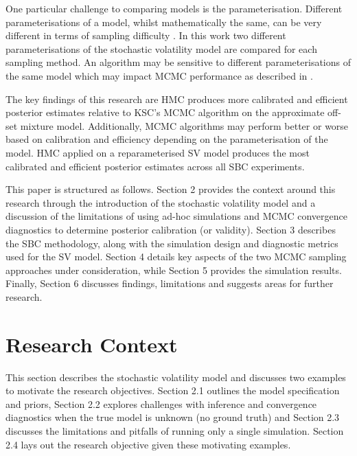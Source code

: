 \documentclass[12pt, a4paper]{article}
\begin{document}
    One particular challenge to comparing models is the parameterisation. Different parameterisations of a model, whilst mathematically the same, can be very different in terms of sampling difficulty \citep{neal2003slice}. In this work two different parameterisations of the stochastic volatility model are compared for each sampling method. An algorithm may be sensitive to different parameterisations of the same model which may impact MCMC performance as described in \citet{strickland2008parameterisation}.
    
    The key findings of this research are HMC produces more calibrated and efficient posterior estimates relative to KSC's MCMC algorithm on the approximate off-set mixture model. Additionally, MCMC algorithms may perform better or worse based on calibration and efficiency depending on the parameterisation of the model. HMC applied on a reparameterised SV model produces the most calibrated and efficient posterior estimates across all SBC experiments.

    This paper is structured as follows. Section 2 provides the context around this research through the introduction of the stochastic volatility model and a discussion of the limitations of using ad-hoc simulations and MCMC convergence diagnostics to determine posterior calibration (or validity). Section 3 describes the SBC methodology, along with the simulation design and diagnostic metrics used for the SV model. Section 4 details key aspects of the two MCMC sampling approaches under consideration, while Section 5 provides the simulation results. Finally, Section 6 discusses findings, limitations and suggests areas for further research.

\section{Research Context}
This section describes the stochastic volatility model and discusses two examples to motivate the research objectives. Section 2.1 outlines the model specification and priors, Section 2.2 explores challenges with inference and convergence diagnostics when the true model is unknown (no ground truth) and Section 2.3 discusses the limitations and pitfalls of running only a single simulation. Section 2.4 lays out the research objective given these motivating examples.
\end{document}
